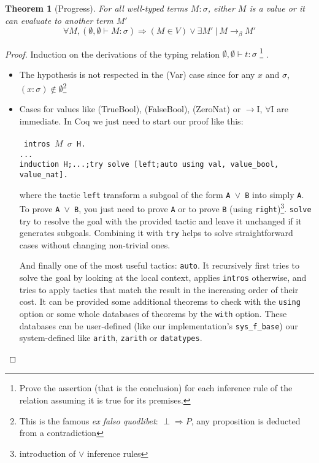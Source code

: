 \documentclass{article}
\newtheorem{theorem}{Theorem}[section]
\begin{document}
    \begin{theorem}[Progress]
    \label{Progress}
    For all well-typed terms $M:\sigma$, either $M$ is a value or it can evaluate to another term $M'$
    $$\forall M, (\emptyset,\emptyset\vdash M:\sigma)\Rightarrow (M \in V) \vee \exists M' \ | \  M\rightarrow_\beta M'$$
    \end{theorem}
    \begin{proof}
        Induction on the derivations of the typing relation $\emptyset,\emptyset\vdash t:\sigma$
        \footnote{Prove the assertion (that is the conclusion) for each inference rule of the relation assuming it is true for its premises. }
        .\par
        \begin{itemize}
            \item The hypothesis is not respected in the (Var) case since for any $x$ and $\sigma$, $(x : \sigma) \not\in\emptyset$\footnote{This is the famous \textit{ex falso quodlibet}: $\perp\Rightarrow P$, any proposition is deducted from a contradiction}
            \item Cases for values like (TrueBool), (FalseBool), (ZeroNat) or $\rightarrow$I, $\forall$I are immediate. In Coq we just need to start our proof like this: \\\\ 
        \texttt{
  intros $M$ $\sigma$ H.\\
  ...\\
  induction H;...;try solve [left;auto using val, value\_bool, value\_nat].
        }\\\par
where the tactic \texttt{left} transform a subgoal of the form \texttt{A $\vee$ B} into simply \texttt{A}. To prove \texttt{A $\vee$ B}, you just need to prove \texttt{A} or to prove \texttt{B} (using \texttt{right})\footnote{introduction of $\vee$ inference rules }. \texttt{solve} try to resolve the goal with the provided tactic and leave it unchanged if it generates subgoals. Combining it with \texttt{try} helps to solve straightforward cases without changing non-trivial ones.\par
And finally one of the most useful tactics: \texttt{auto}. It recursively first tries to solve the goal by looking at the local context, applies \texttt{intros} otherwise, and tries to apply tactics that match the result in the increasing order of their cost. It can be provided some additional theorems to check with the \texttt{using} option or some whole databases of theorems by the \texttt{with} option. These databases can be user-defined (like our implementation's \texttt{sys\_f\_base}) our system-defined like \texttt{arith}, \texttt{zarith} or \texttt{datatypes}.

\end{itemize}
\end{proof}
\end{document}
